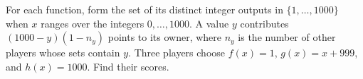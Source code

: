 For each function, form the set of its distinct integer outputs in $\{1,\ldots,1000\}$ when $x$ ranges over the integers $0,\ldots,1000$. A value $y$ contributes $(1000-y)(1-n_y)$ points to its owner, where $n_y$ is the number of other players whose sets contain $y$. Three players choose $f(x)=1$, $g(x)=x+999$, and $h(x)=1000$. Find their scores.
